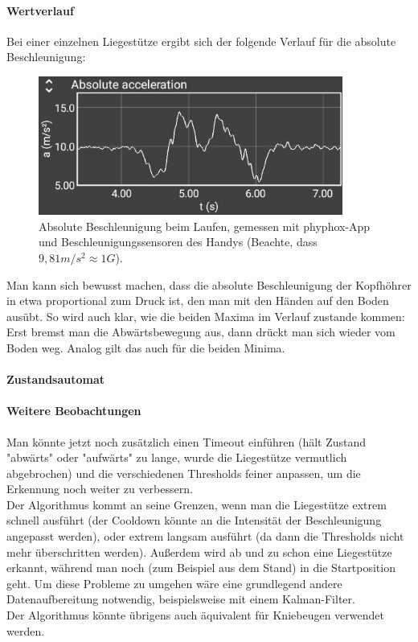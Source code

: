 \documentclass[a4paper,12pt]{article}
\begin{document}
\paragraph{Wertverlauf}
Bei einer einzelnen Liegestütze ergibt sich der folgende Verlauf für die absolute Beschleunigung:
\begin{figure}
	\centering
\includegraphics[width = 10cm]{bilder/pushup_sample.jpg}
	\caption{Absolute Beschleunigung beim Laufen, gemessen mit phyphox-App und Beschleunigungssensoren des Handys (Beachte, dass $9,81 m/s^2 \approx 1 G$).}
\end{figure} 
Man kann sich bewusst machen, dass die absolute Beschleunigung der Kopfhöhrer in etwa proportional zum Druck ist, den man mit den Händen auf den Boden ausübt. So wird auch klar, wie die beiden Maxima im Verlauf zustande kommen: Erst bremst man die Abwärtsbewegung aus, dann drückt man sich wieder vom Boden weg. Analog gilt das auch für die beiden Minima. 
\paragraph{Zustandsautomat}


\paragraph{Weitere Beobachtungen}
Man könnte jetzt noch zusätzlich einen Timeout einführen (hält Zustand "abwärts" oder "aufwärts" zu lange, wurde die Liegestütze vermutlich abgebrochen) und die verschiedenen Thresholds feiner anpassen, um die Erkennung noch weiter zu verbessern.\\
Der Algorithmus kommt an seine Grenzen, wenn man die Liegestütze extrem schnell ausführt (der Cooldown könnte an die Intensität der Beschleunigung angepasst werden), oder extrem langsam ausführt (da dann die Thresholds nicht mehr überschritten werden). Außerdem wird ab und zu schon eine Liegestütze erkannt, während man noch (zum Beispiel aus dem Stand) in die Startposition geht. Um diese Probleme zu umgehen wäre eine grundlegend andere Datenaufbereitung notwendig, beispielsweise mit einem Kalman-Filter.\\
Der Algorithmus könnte übrigens auch äquivalent für Kniebeugen verwendet werden.
\end{document}

